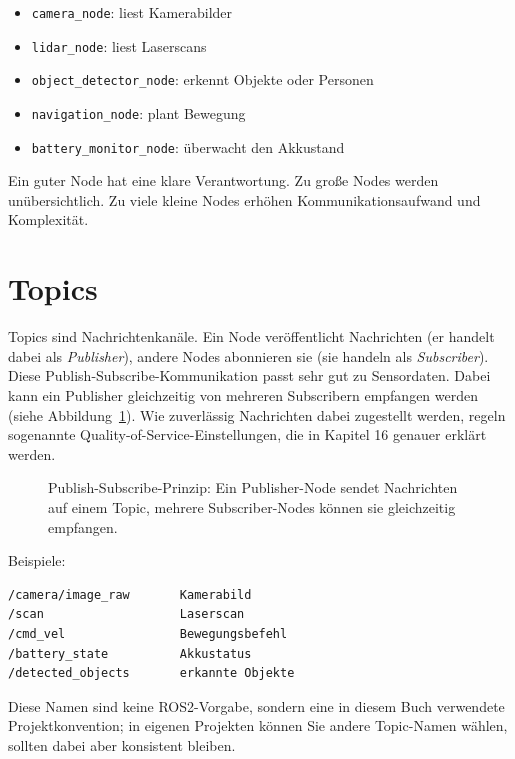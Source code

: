 \begin{itemize}
    \item \texttt{camera\_node}: liest Kamerabilder
    \item \texttt{lidar\_node}: liest Laserscans
    \item \texttt{object\_detector\_node}: erkennt Objekte oder Personen
    \item \texttt{navigation\_node}: plant Bewegung
    \item \texttt{battery\_monitor\_node}: überwacht den Akkustand
\end{itemize}

Ein guter Node hat eine klare Verantwortung. Zu große Nodes werden unübersichtlich. Zu viele kleine Nodes erhöhen Kommunikationsaufwand und Komplexität.

\section{Topics}
Topics sind Nachrichtenkanäle. Ein Node veröffentlicht Nachrichten (er handelt dabei als \emph{Publisher}), andere Nodes abonnieren sie (sie handeln als \emph{Subscriber}). Diese Publish-Subscribe-Kommunikation passt sehr gut zu Sensordaten. Dabei kann ein Publisher gleichzeitig von mehreren Subscribern empfangen werden (siehe Abbildung~\ref{fig:kap14-publish-subscribe}). Wie zuverlässig Nachrichten dabei zugestellt werden, regeln sogenannte Quality-of-Service-Einstellungen, die in Kapitel 16 genauer erklärt werden.

\begin{figure}[H]
  \centering
  \caption{Publish-Subscribe-Prinzip: Ein Publisher-Node sendet Nachrichten auf einem Topic, mehrere Subscriber-Nodes können sie gleichzeitig empfangen.}
  \label{fig:kap14-publish-subscribe}
\end{figure}

Beispiele:

\begin{lstlisting}[style=plaintext]
/camera/image_raw       Kamerabild
/scan                   Laserscan
/cmd_vel                Bewegungsbefehl
/battery_state          Akkustatus
/detected_objects       erkannte Objekte
\end{lstlisting}

Diese Namen sind keine ROS2-Vorgabe, sondern eine in diesem Buch verwendete Projektkonvention; in eigenen Projekten können Sie andere Topic-Namen wählen, sollten dabei aber konsistent bleiben.


